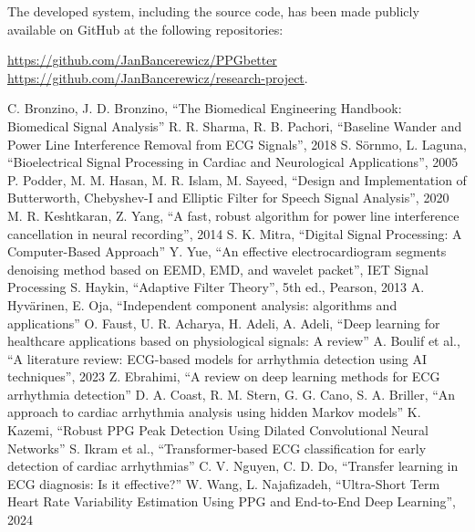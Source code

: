 \documentclass[journal]{IEEEtran}
\begin{document}
\newpage

The developed system, including the source code, has been made publicly available on GitHub at the following repositories:

\noindent
\href{https://github.com/JanBancerewicz/PPGbetter}{https://github.com/JanBancerewicz/PPGbetter}
\href{https://github.com/JanBancerewicz/research-project}{https://github.com/JanBancerewicz/research-project}.

 

\begin{thebibliography}{1}
C. Bronzino, J. D. Bronzino, “The Biomedical Engineering Handbook: Biomedical Signal Analysis”
R. R. Sharma, R. B. Pachori, “Baseline Wander and Power Line Interference Removal from ECG Signals”, 2018
S. Sörnmo, L. Laguna, “Bioelectrical Signal Processing in Cardiac and Neurological Applications”, 2005
P. Podder, M. M. Hasan, M. R. Islam, M. Sayeed, “Design and Implementation of Butterworth, Chebyshev-I and Elliptic Filter for Speech Signal Analysis”, 2020
M. R. Keshtkaran, Z. Yang, “A fast, robust algorithm for power line interference cancellation in neural recording”, 2014
S. K. Mitra, “Digital Signal Processing: A Computer-Based Approach”
Y. Yue, “An effective electrocardiogram segments denoising method based on EEMD, EMD, and wavelet packet”, IET Signal Processing
S. Haykin, “Adaptive Filter Theory”, 5th ed., Pearson, 2013
A. Hyvärinen, E. Oja, “Independent component analysis: algorithms and applications”
O. Faust, U. R. Acharya, H. Adeli, A. Adeli, “Deep learning for healthcare applications based on physiological signals: A review”
A. Boulif et al., “A literature review: ECG-based models for arrhythmia detection using AI techniques”, 2023
Z. Ebrahimi, “A review on deep learning methods for ECG arrhythmia detection”
D. A. Coast, R. M. Stern, G. G. Cano, S. A. Briller, “An approach to cardiac arrhythmia analysis using hidden Markov models”
K. Kazemi, “Robust PPG Peak Detection Using Dilated Convolutional Neural Networks”
S. Ikram et al., “Transformer-based ECG classification for early detection of cardiac arrhythmias”
C. V. Nguyen, C. D. Do, “Transfer learning in ECG diagnosis: Is it effective?”
W. Wang, L. Najafizadeh, “Ultra-Short Term Heart Rate Variability Estimation Using PPG and End-to-End Deep Learning”, 2024

\end{thebibliography}
\end{document}

